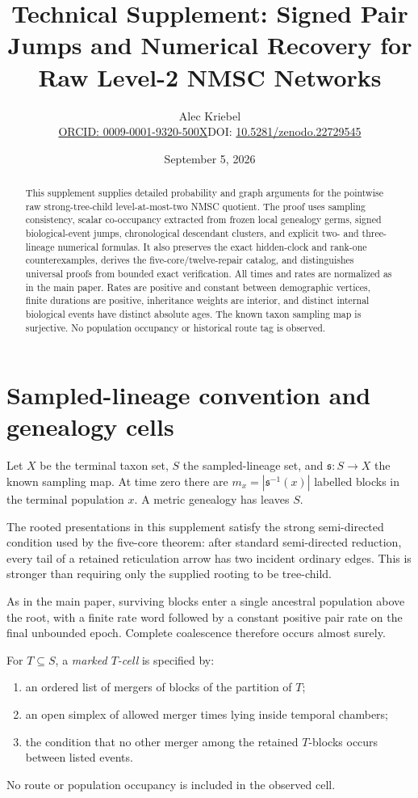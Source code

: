 \documentclass[11pt]{article}
\title{\textbf{Technical Supplement: Signed Pair Jumps and Numerical Recovery for Raw Level-2 NMSC Networks}}
\author{Alec Kriebel\\\small\href{https://orcid.org/0009-0001-9320-500X}{ORCID: 0009-0001-9320-500X}\quad DOI: \href{https://doi.org/10.5281/zenodo.22729545}{10.5281/zenodo.22729545}}
\date{September 5, 2026}
\begin{document}
\maketitle

\begin{abstract}
This supplement supplies detailed probability and graph arguments for the pointwise raw strong-tree-child level-at-most-two NMSC quotient. The proof uses sampling consistency, scalar co-occupancy extracted from frozen local genealogy germs, signed biological-event jumps, chronological descendant clusters, and explicit two- and three-lineage numerical formulas. It also preserves the exact hidden-clock and rank-one counterexamples, derives the five-core/twelve-repair catalog, and distinguishes universal proofs from bounded exact verification. All times and rates are normalized as in the main paper. Rates are positive and constant between demographic vertices, finite durations are positive, inheritance weights are interior, and distinct internal biological events have distinct absolute ages. The known taxon sampling map is surjective. No population occupancy or historical route tag is observed.
\end{abstract}

\section{Sampled-lineage convention and genealogy cells}
Let $X$ be the terminal taxon set, $S$ the sampled-lineage set, and $\mathfrak s:S\to X$ the known sampling map.  At time zero there are $m_x=|\mathfrak s^{-1}(x)|$ labelled blocks in the terminal population $x$.  A metric genealogy has leaves $S$.

The rooted presentations in this supplement satisfy the strong semi-directed condition used by the five-core theorem: after standard semi-directed reduction, every tail of a retained reticulation arrow has two incident ordinary edges.  This is stronger than requiring only the supplied rooting to be tree-child.

As in the main paper, surviving blocks enter a single ancestral population above the root, with a finite rate word followed by a constant positive pair rate on the final unbounded epoch.  Complete coalescence therefore occurs almost surely.

For $T\subseteq S$, a \emph{marked $T$-cell} is specified by:
\begin{enumerate}
\item an ordered list of mergers of blocks of the partition of $T$;
\item an open simplex of allowed merger times lying inside temporal chambers;
\item the condition that no other merger among the retained $T$-blocks occurs between listed events.
\end{enumerate}
No route or population occupancy is included in the observed cell.
\end{document}
